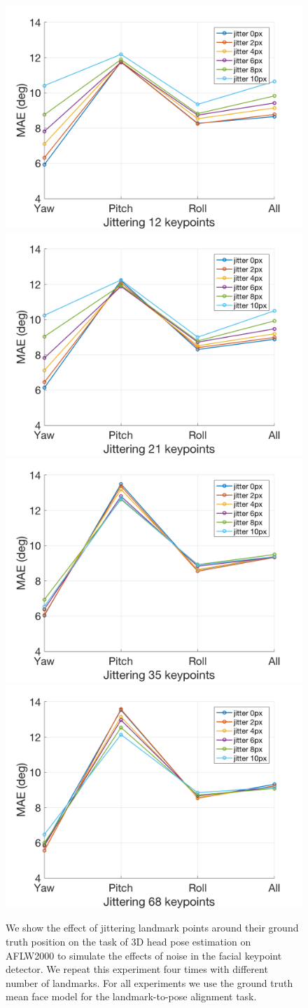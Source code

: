\documentclass[10pt,twocolumn,letterpaper]{article}
\begin{document}
\begin{figure}[t]
\begin{center}
   \includegraphics[width=0.24\linewidth]{jitter12pts}
   \includegraphics[width=0.24\linewidth]{jitter21pts}
   \includegraphics[width=0.24\linewidth]{jitter35pts}
   \includegraphics[width=0.24\linewidth]{jitter68pts}
\end{center}
   \caption{We show the effect of jittering landmark points around their ground truth position on the task of 3D head pose estimation on AFLW2000 to simulate the effects of noise in the facial keypoint detector. We repeat this experiment four times with different number of landmarks. For all experiments we use the ground truth mean face model for the landmark-to-pose alignment task.}
   \label{jittering}
\end{figure}
\end{document}

